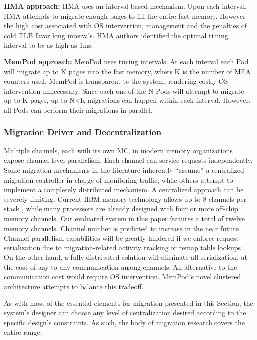 	\textbf{HMA approach:} HMA uses an interval based mechanism. Upon each interval, HMA attempts to migrate enough pages to fill the entire fast memory. However the high cost associated with OS intervention, management and the penalties of cold TLB favor long intervals. HMA authors identified the optimal timing interval to be as high as 1ms.
	
	\textbf{MemPod approach:} MemPod uses timing intervals. At each interval each Pod will migrate up to K pages into the fast memory, where K is the number of MEA counters used. MemPod is transparent to the system, rendering costly OS intervention unnecessary. Since each one of the N Pods will attempt to migrate up to K pages, up to N$\times$K migrations can happen within each interval. However, all Pods can perform their migrations in parallel. %
	

\subsubsection{Migration Driver and Decentralization}

Multiple channels, each with its own MC, in modern memory organizations expose channel-level parallelism. Each channel can service requests independently. Some migration mechanisms in the literature inherently ``assume'' a centralized migration controller in charge of monitoring traffic, while others attempt to implement a completely distributed mechanism. A centralized approach can be severely limiting. Current HBM memory technology allows up to 8 channels per stack \cite{JEDEC-HBM-REVISED}, while many processors are already designed with four or more off-chip memory channels. Our evaluated system in this paper features a total of twelve memory channels. Channel number is predicted to increase in the near future \TODO{[cite]}. Channel parallelism capabilities will be greatly hindered if we enforce request serialization due to migration-related activity tracking or remap table lookups. On the other hand, a fully distributed solution will eliminate all serialization, at the cost of any-to-any communication among channels. An alternative to the communication cost would require OS intervention. MemPod's novel clustered architecture attempts to balance this tradeoff. 

As with most of the essential elements for migration presented in this Section, the system's designer can choose any level of centralization desired according to the specific design's constraints. As such, the body of migration research covers the entire range:

